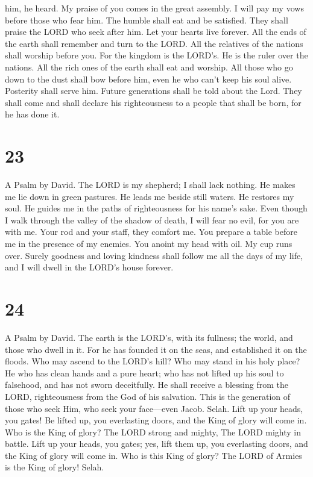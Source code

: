 him, he heard.  My praise of you comes in the great
assembly. I will pay my vows before those who fear him. 
The humble shall eat and be satisfied. They shall praise the LORD who
seek after him. Let your hearts live forever.  All the ends
of the earth shall remember and turn to the LORD. All the relatives of
the nations shall worship before you.  For the kingdom is
the LORD's. He is the ruler over the nations.  All the rich
ones of the earth shall eat and worship. All those who go down to the
dust shall bow before him, even he who can't keep his soul alive.
 Posterity shall serve him. Future generations shall be
told about the Lord.  They shall come and shall declare his
righteousness to a people that shall be born, for he has done it.

\hypertarget{section-22}{%
\section{23}\label{section-22}}

A Psalm by David.  The LORD is my shepherd; I shall lack
nothing.  He makes me lie down in green pastures. He leads
me beside still waters.  He restores my soul. He guides me
in the paths of righteousness for his name's sake.  Even
though I walk through the valley of the shadow of death, I will fear no
evil, for you are with me. Your rod and your staff, they comfort me.
 You prepare a table before me in the presence of my
enemies. You anoint my head with oil. My cup runs over. 
Surely goodness and loving kindness shall follow me all the days of my
life, and I will dwell in the LORD's house forever.

\hypertarget{section-23}{%
\section{24}\label{section-23}}

A Psalm by David.  The earth is the LORD's, with its
fullness; the world, and those who dwell in it.  For he has
founded it on the seas, and established it on the floods. 
Who may ascend to the LORD's hill? Who may stand in his holy place?
 He who has clean hands and a pure heart; who has not lifted
up his soul to falsehood, and has not sworn deceitfully.  He
shall receive a blessing from the LORD, righteousness from the God of
his salvation.  This is the generation of those who seek
Him, who seek your face---even Jacob. Selah.  Lift up your
heads, you gates! Be lifted up, you everlasting doors, and the King of
glory will come in.  Who is the King of glory? The LORD
strong and mighty, The LORD mighty in battle.  Lift up your
heads, you gates; yes, lift them up, you everlasting doors, and the King
of glory will come in.  Who is this King of glory? The LORD
of Armies is the King of glory! Selah.

